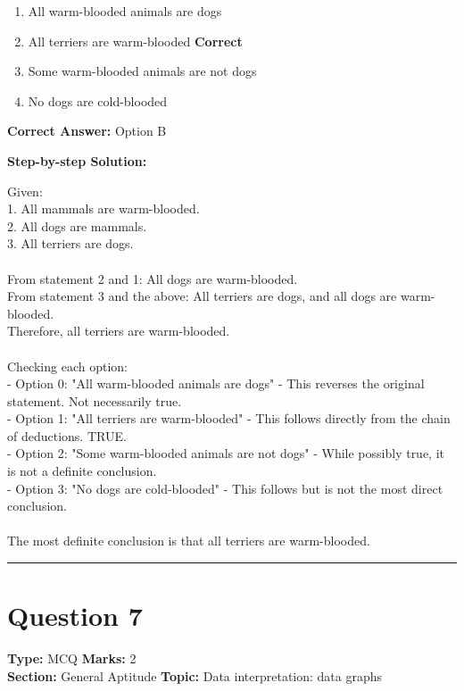 \documentclass[11pt]{article}
\begin{document}
\begin{enumerate}[label=\textbf{\Alph*.}, leftmargin=1.8em]
\item All warm-blooded animals are dogs\item All terriers are warm-blooded \hfill {\color{gategreen}\textbf{Correct}}\item Some warm-blooded animals are not dogs\item No dogs are cold-blooded\end{enumerate}

\textbf{Correct Answer:} Option B

\textbf{Step-by-step Solution:}

Given:\\
 1. All mammals are warm-blooded.\\
 2. All dogs are mammals.\\
 3. All terriers are dogs.\\
\\
 From statement 2 and 1: All dogs are warm-blooded.\\
 From statement 3 and the above: All terriers are dogs, and all dogs are warm-blooded.\\
 Therefore, all terriers are warm-blooded.\\
\\
 Checking each option:\\
 - Option 0: "All warm-blooded animals are dogs" - This reverses the original statement. Not necessarily true.\\
 - Option 1: "All terriers are warm-blooded" - This follows directly from the chain of deductions. TRUE.\\
 - Option 2: "Some warm-blooded animals are not dogs" - While possibly true, it is not a definite conclusion.\\
 - Option 3: "No dogs are cold-blooded" - This follows but is not the most direct conclusion.\\
\\
 The most definite conclusion is that all terriers are warm-blooded.

\vspace{0.8em}
\hrule
\vspace{0.4em}
\section*{Question 7}
\textbf{Type:} MCQ \hfill \textbf{Marks:} 2\\
\textbf{Section:} General Aptitude \hfill \textbf{Topic:} Data interpretation: data graphs
\end{document}
